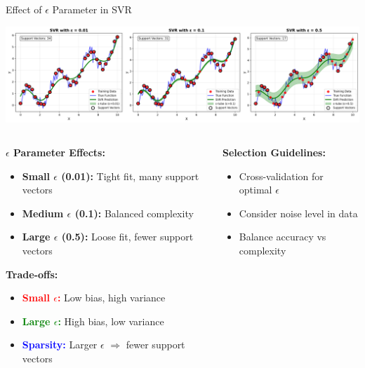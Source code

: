 \documentclass[8pt,aspectratio=1610]{beamer}
\begin{document}
\begin{frame}{Effect of $\epsilon$ Parameter in SVR}
\begin{center}
\includegraphics[width=\textwidth]{../figures/epsilon_parameter_effect.png}
\end{center}

\begin{columns}[t]
\begin{column}{0.48\textwidth}
\textbf{$\epsilon$ Parameter Effects:}
\vspace{0.2cm}

\begin{itemize}
\setlength{\itemsep}{1pt}
\item \textbf{Small $\epsilon$ (0.01):} Tight fit, many support vectors
\item \textbf{Medium $\epsilon$ (0.1):} Balanced complexity
\item \textbf{Large $\epsilon$ (0.5):} Loose fit, fewer support vectors
\end{itemize}

\vspace{0.3cm}
\textbf{Trade-offs:}
\begin{itemize}
\setlength{\itemsep}{1pt}
\item \textcolor{red}{\textbf{Small $\epsilon$:}} Low bias, high variance
\item \textcolor{green}{\textbf{Large $\epsilon$:}} High bias, low variance
\item \textcolor{blue}{\textbf{Sparsity:}} Larger $\epsilon$ $\Rightarrow$ fewer support vectors
\end{itemize}
\end{column}

\begin{column}{0.48\textwidth}
\textbf{Selection Guidelines:}
\vspace{0.2cm}

\begin{itemize}
\setlength{\itemsep}{1pt}
\item Cross-validation for optimal $\epsilon$
\item Consider noise level in data
\item Balance accuracy vs complexity
\end{itemize}


\end{column}
\end{columns}
\end{frame}
\end{document}
